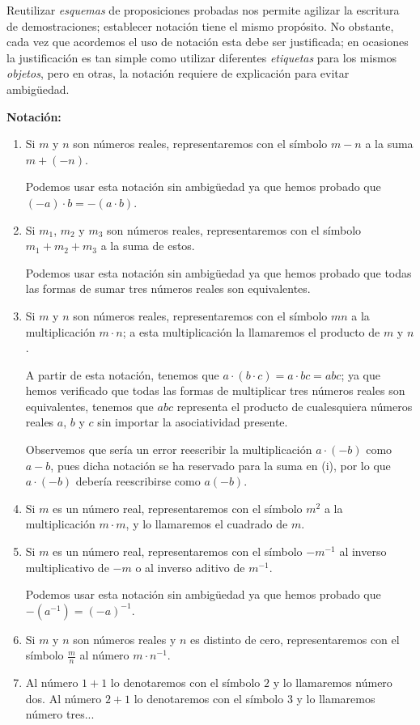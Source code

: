\documentclass[11pt]{article}
\begin{document}
    Reutilizar \textit{esquemas} de proposiciones probadas nos permite agilizar la escritura de demostraciones; establecer notación tiene el mismo propósito. No obstante, cada vez que acordemos el uso de notación esta debe ser justificada; en ocasiones la justificación es tan simple como utilizar diferentes \textit{etiquetas} para los mismos \textit{objetos}, pero en otras, la notación requiere de explicación para evitar ambigüedad.

    \textbf{Notación:}

    \begin{enumerate}[label=\roman*)]
    \item Si $m$ y $n$ son números reales, representaremos con el símbolo $m-n$ a la suma $m+ (-n)$.
    
    Podemos usar esta notación sin ambigüedad ya que hemos probado que $(-a)\cdot b = -(a \cdot b)$.

    \item Si $m_1$, $m_2$ y $m_3$ son números reales, representaremos con el símbolo $m_1+m_2+ m_3$ a la suma de estos.
    
    Podemos usar esta notación sin ambigüedad ya que hemos probado que todas las formas de sumar tres números reales son equivalentes.

    \item Si $m$ y $n$ son números reales, representaremos con el símbolo $mn$ a la multiplicación $m\cdot n$; a esta multiplicación la llamaremos el producto de $m$ y $n$.
    
    A partir de esta notación, tenemos que $a\cdot (b\cdot c)= a\cdot bc=abc$; ya que hemos verificado que todas las formas de multiplicar tres números reales son equivalentes, tenemos que $abc$ representa el producto de cualesquiera números reales $a$, $b$ y $c$ sin importar la asociatividad presente.

    Observemos que sería un error reescribir la multiplicación $a\cdot (-b)$ como $a-b$, pues dicha notación se ha reservado para la suma en (i), por lo que $a\cdot (-b)$ debería reescribirse como $a(-b)$.

    \item Si $m$ es un número real, representaremos con el símbolo $m^2$ a la multiplicación $m\cdot m$, y lo llamaremos el cuadrado de $m$.
    
    \item Si $m$ es un número real, representaremos con el símbolo $-m^{-1}$ al inverso multiplicativo de $-m$ o al inverso aditivo de $m^{-1}$.
        
    Podemos usar esta notación sin ambigüedad ya que hemos probado que $-(a^{-1})=(-a)^{-1}$.
    
    \item Si $m$ y $n$ son números reales y $n$ es distinto de cero, representaremos con el símbolo $ \frac{m}{n}$ al número $m \cdot n^{-1} $.
    
    \item Al número $1+1$ lo denotaremos con el símbolo $2$ y lo llamaremos número dos. Al número $2+1$ lo denotaremos con el símbolo $3$ y lo llamaremos número tres...
    \end{enumerate}
\end{document}
